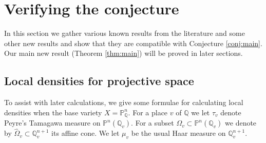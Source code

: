 \documentclass[a4paper,12pt,reqno]{amsart}
\numberwithin{equation}{section} \numberwithin{figure}{section}
\renewcommand\P{\mathbb{P}}
\newcommand\Q{\mathbb{Q}}
\renewcommand{\#}{\sharp}
\theoremstyle{definition}
\numberwithin{lemma}{section}
\begin{document}
\section{Verifying the conjecture} \label{sec:verify}

In this section we gather various known results from the literature and some other new results and show that they are compatible with Conjecture \ref{conj:main}. Our main new result (Theorem \ref{thm:main}) will be proved in later sections.


\subsection{Local densities for projective space}
To assist with later calculations, we give some formulae for calculating local densities when the base variety $X = \P^n_\Q$. For a place $v$ of $\Q$ we let $\tau_v$ denote Peyre's Tamagawa measure on $\P^n(\Q_v)$. For a subset $\Omega_v \subset \P^n(\Q_v)$ we denote by $\widehat{\Omega}_v \subset \Q_v^{n+1}$ its affine cone. We let $\mu_v$ be the usual Haar measure on $\Q_v^{n+1}$.
\end{document}

